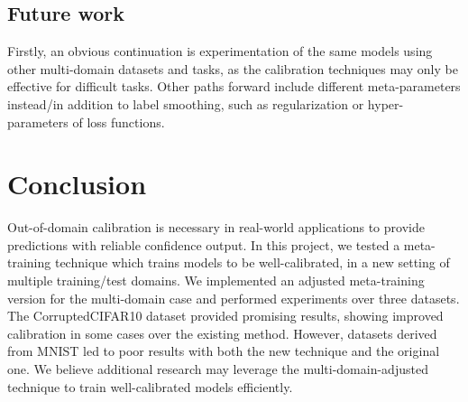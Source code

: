 \documentclass[12pt,a4paper]{article}
\begin{document}
\subsection{Future work}
Firstly, an obvious continuation is experimentation of the same models using other multi-domain datasets and tasks, as the calibration techniques may only be effective for difficult tasks. Other paths forward include different meta-parameters instead/in addition to label smoothing, such as regularization or hyper-parameters of loss functions.
	
	
\pagebreak
\section{Conclusion}
\label{sec:Conclusion}
Out-of-domain calibration is necessary in real-world applications to provide predictions with reliable confidence output. In this project, we tested a meta-training technique which trains models to be well-calibrated, in a new setting of multiple training/test domains. We implemented an adjusted meta-training version for the multi-domain case and performed experiments over three datasets. The CorruptedCIFAR10 dataset provided promising results, showing improved calibration in some cases over the existing method. However, datasets derived from MNIST led to poor results with both the new technique and the original one. We believe additional research may leverage the multi-domain-adjusted technique to train well-calibrated models efficiently.



\end{document}
